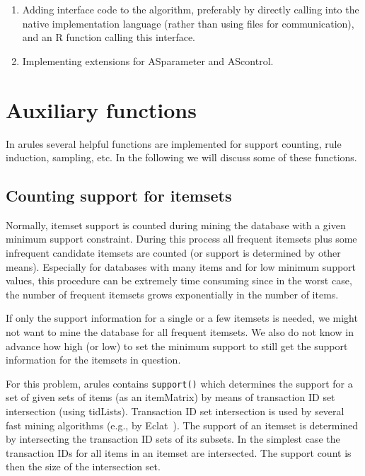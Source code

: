 \documentclass[10pt,a4paper]{article}
\newcommand{\strong}[1]{{\normalfont\fontseries{b}\selectfont #1}}
\newcommand{\class}[1]{\mbox{\textsf{#1}}}
\newcommand{\func}[1]{\mbox{\texttt{#1()}}}
\newcommand{\pkg}[1]{\strong{#1}}
\newcommand{\proglang}[1]{\textsf{#1}}
\begin{document}
\begin{enumerate}
 \item Adding interface code to the algorithm, preferably by directly
  calling into the native implementation language (rather than using
  files for communication), and an \proglang{R} function calling this
  interface.
 \item Implementing extensions for \class{ASparameter} and
  \class{AScontrol}.
\end{enumerate}



\section{Auxiliary functions \label{sec:auxiliary}}

In \pkg{arules} several helpful functions are implemented for
support counting, rule induction, sampling, etc.
In the following we will discuss some of these functions.

\subsection{Counting support for itemsets\label{sec:counting}}

Normally, itemset support is counted during mining the database with a
given minimum support constraint.  During this process all frequent
itemsets plus some infrequent candidate itemsets are counted (or support
is determined by other means).  Especially for databases with many items
and for low minimum support values, this procedure can be extremely time
consuming since in the worst case, the number of frequent itemsets grows
exponentially in the number of items.

If only the support information for a single or a few itemsets is needed,
we might not want to mine the database for all frequent itemsets. 
We also do not know in advance how high (or low) to set the minimum support to
still get the support information for the itemsets in question.

For this problem, \pkg{arules} contains \func{support}
which determines the support for a set of given sets of items
(as an \class{itemMatrix}) by means of transaction ID set 
intersection (using \class{tidLists}).
Transaction ID set intersection is used by several fast mining algorithms 
(e.g., by Eclat~\citep{arules:Zaki+Parthasarathy+Ogihara+Li:1997}). 
The support of an itemset is determined by intersecting
the transaction ID sets of its subsets. In the simplest case 
the transaction IDs for all items in an itemset are intersected.
The support count is then the size of the intersection set.
\end{document}
